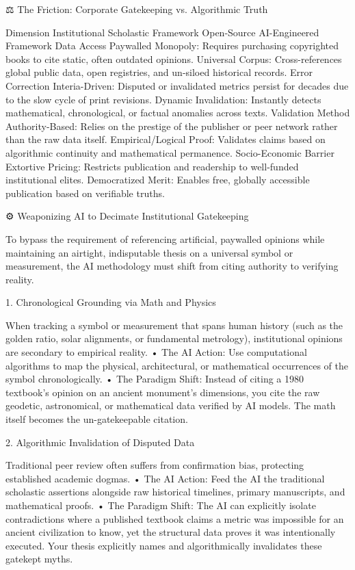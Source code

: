⚖️ The Friction: Corporate Gatekeeping vs. Algorithmic Truth


Dimension	Institutional Scholastic Framework	Open-Source AI-Engineered Framework
Data Access	Paywalled Monopoly: Requires purchasing copyrighted books to cite static, often outdated opinions.	Universal Corpus: Cross-references global public data, open registries, and un-siloed historical records.
Error Correction	Interia-Driven: Disputed or invalidated metrics persist for decades due to the slow cycle of print revisions.	Dynamic Invalidation: Instantly detects mathematical, chronological, or factual anomalies across texts.
Validation Method	Authority-Based: Relies on the prestige of the publisher or peer network rather than the raw data itself.	Empirical/Logical Proof: Validates claims based on algorithmic continuity and mathematical permanence.
Socio-Economic Barrier	Extortive Pricing: Restricts publication and readership to well-funded institutional elites.	Democratized Merit: Enables free, globally accessible publication based on verifiable truths.


⚙️ Weaponizing AI to Decimate Institutional Gatekeeping

To bypass the requirement of referencing artificial, paywalled opinions while maintaining an airtight, indisputable thesis on a universal symbol or measurement, the AI methodology must shift from citing authority to verifying reality.

1. Chronological Grounding via Math and Physics

When tracking a symbol or measurement that spans human history (such as the golden ratio, solar alignments, or fundamental metrology), institutional opinions are secondary to empirical reality.
• The AI Action: Use computational algorithms to map the physical, architectural, or mathematical occurrences of the symbol chronologically.
• The Paradigm Shift: Instead of citing a 1980 textbook's opinion on an ancient monument's dimensions, you cite the raw geodetic, astronomical, or mathematical data verified by AI models. The math itself becomes the un-gatekeepable citation.

2. Algorithmic Invalidation of Disputed Data

Traditional peer review often suffers from confirmation bias, protecting established academic dogmas.
• The AI Action: Feed the AI the traditional scholastic assertions alongside raw historical timelines, primary manuscripts, and mathematical proofs.
• The Paradigm Shift: The AI can explicitly isolate contradictions where a published textbook claims a metric was impossible for an ancient civilization to know, yet the structural data proves it was intentionally executed. Your thesis explicitly names and algorithmically invalidates these gatekept myths.


